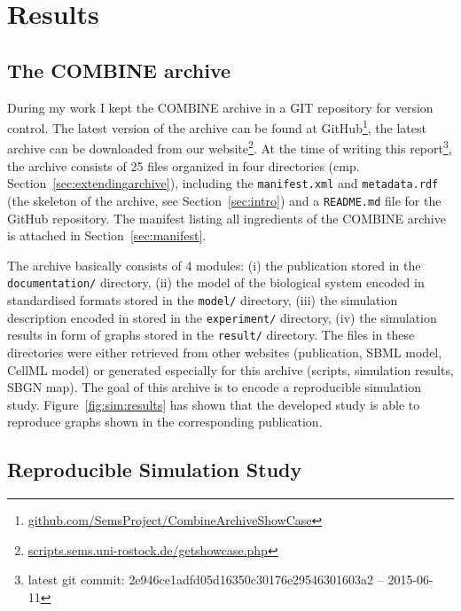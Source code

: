 
\section{Results}

\subsection{The COMBINE archive}
During my work I kept the COMBINE archive in a GIT repository for version control.
The latest version of the archive can be found at GitHub\footnote{\href{https://github.com/SemsProject/CombineArchiveShowCase}{github.com/SemsProject/CombineArchiveShowCase}}, the latest archive can be downloaded from our website\footnote{\href{http://scripts.sems.uni-rostock.de/getshowcase.php}{scripts.sems.uni-rostock.de/getshowcase.php}}.
At the time of writing this report\footnote{latest git commit: 2e946ce1adfd05d16350c30176e29546301603a2 -- 2015-06-11}, the archive consists of 25 files organized in four directories (cmp. Section~\ref{sec:extendingarchive}), including the \texttt{manifest.xml} and \texttt{metadata.rdf} (the skeleton of the archive, see Section~\ref{sec:intro}) and a \texttt{README.md} file for the GitHub repository.
The manifest listing all ingredients of the COMBINE archive is attached in Section~\ref{sec:manifest}.

The archive basically consists of 4 modules: (i) the publication stored in the \texttt{documentation/} directory, (ii) the model of the biological system encoded in standardised formats stored in the \texttt{model/} directory, (iii) the simulation description encoded in \sedml stored in the \texttt{experiment/} directory, (iv) the simulation results in form of graphs stored in the \texttt{result/} directory.
The files in these directories were either retrieved from other websites (publication, SBML model, CellML model) or generated especially for this archive (\sedml scripts, simulation results, SBGN map).
The goal of this archive is to encode a reproducible simulation study.
Figure~\ref{fig:sim:results} has shown that the developed study is able to reproduce graphs shown in the corresponding publication.

\subsection{Reproducible Simulation Study}

